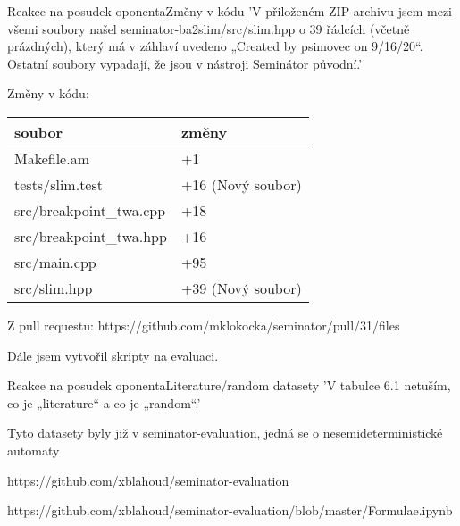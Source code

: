 \documentclass[
]{beamer}
\newcommand{\hlineny}{\hline}
\begin{document}
	\begin{frame}{Reakce na posudek oponenta}{Změny v kódu}
		'V přiloženém ZIP archivu jsem mezi všemi soubory našel seminator-ba2slim/src/slim.hpp o 39 řádcích (včetně prázdných),  který má v záhlaví uvedeno  „Created by psimovec on 9/16/20“.  Ostatní soubory vypadají, že jsou v nástroji Seminátor původní.'
		
		
		Změny v kódu:
		
	\begin{table}[ht]
		\centering
		
		
		
		\begin{tabular}{|l|l|}
			\hline
			soubor  &   změny \\
			\hline
			\hline
			Makefile.am & +1\\
			\hlineny
			tests/slim.test          &       +16 (Nový soubor)\\
			
			\hline
			src/breakpoint\_twa.cpp    &     +18 \\
			\hline
			src/breakpoint\_twa.hpp      &        +16 \\
			\hlineny
			src/main.cpp&  	+95\\\hlineny
			src/slim.hpp&+39 (Nový soubor)\\\hline
			
		\end{tabular}
	\end{table}
		Z pull requestu: https://github.com/mklokocka/seminator/pull/31/files
		
					
		Dále jsem vytvořil skripty na evaluaci.
	\end{frame}

	\begin{frame}{Reakce na posudek oponenta}{Literature/random datasety}
		'V tabulce 6.1 netuším, co je „literature“ a co je „random“.'
		
		Tyto datasety byly již v seminator-evaluation, jedná se o nesemideterministické automaty
		
		
		{https://github.com/xblahoud/seminator-evaluation}
		
		{https://github.com/xblahoud/seminator-evaluation/blob/master/Formulae.ipynb}
		
	\end{frame}
	
	
\end{document}
